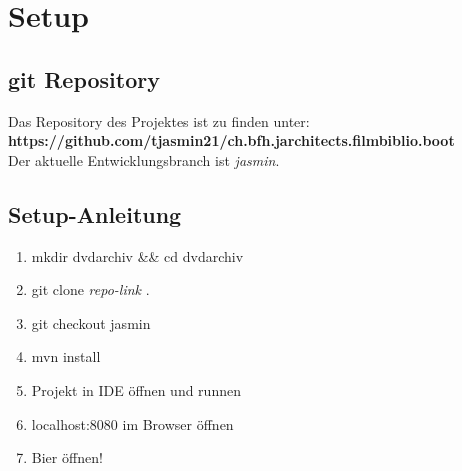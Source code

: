 \chapter{Setup}

\section{git Repository}
Das Repository des Projektes ist zu finden unter:\\

\textbf{https://github.com/tjasmin21/ch.bfh.jarchitects.filmbiblio.boot}
\\

Der aktuelle Entwicklungsbranch ist \emph{jasmin}.

\section{Setup-Anleitung}

\begin{enumerate} 
	\item mkdir dvdarchiv \&\& cd dvdarchiv
	\item git clone \emph{repo-link} .
	\item git checkout jasmin
	\item mvn install
	\item Projekt in IDE öffnen und runnen
	\item localhost:8080 im Browser öffnen
	\item Bier öffnen!
\end{enumerate}
